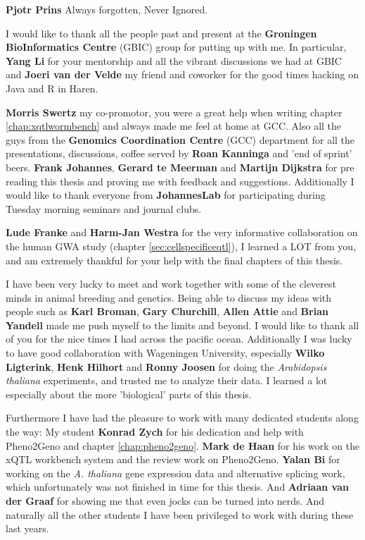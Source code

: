 {\bf Pjotr Prins} Always forgotten, Never Ignored. 

I would like to thank all the people past and present at the {\bf Groningen BioInformatics Centre} 
(GBIC) group for putting up with me. In particular, {\bf Yang Li} for your mentorship and all the 
vibrant discussions we had at GBIC and {\bf Joeri van der Velde} my friend and coworker for the 
good times hacking on Java and R in Haren.

{\bf Morris Swertz} my co-promotor, you were a great help when writing chapter \ref{chap:xqtlwormbench} 
and always made me feel at home at GCC. Also all the guys from the {\bf Genomics Coordination 
Centre} (GCC) department for all the presentations, discussions, coffee served by {\bf Roan Kanninga} and 'end of sprint' beers. 
{\bf Frank Johannes}, {\bf Gerard te Meerman} and {\bf Martijn Dijkstra} for pre reading this thesis and proving me 
with feedback and suggestions. Additionally I would like to thank everyone from {\bf JohannesLab} for participating during Tuesday morning 
seminars and journal clubs. 

{\bf Lude Franke} and {\bf Harm-Jan Westra} for the very informative collaboration on the 
human GWA study (chapter \ref{sec:cellspecificeqtl}), I learned a LOT from you, and am 
extremely thankful for your help with the final chapters of this thesis. 

I have been very lucky to meet and work together with some of the cleverest minds in animal breeding 
and genetics. Being able to discuss my ideas with people such as {\bf Karl Broman}, {\bf Gary Churchill}, 
{\bf Allen Attie} and {\bf Brian Yandell} made me push myself to the limits and beyond. I would like 
to thank all of you for the nice times I had across the pacific ocean. 
Additionally I was lucky to have good collaboration with Wageningen University, especially {\bf Wilko 
Ligterink}, {\bf Henk Hilhort} and {\bf Ronny Joosen} for doing the \emph{Arabidopsis thaliana} 
experiments, and trusted me to analyze their data. I learned a lot especially about the more 'biological' 
parts of this thesis. 

Furthermore I have had the pleasure to work with many dedicated students along the way: 
My student {\bf Konrad Zych} for his dedication and help with Pheno2Geno and chapter \ref{chap:pheno2geno}. 
{\bf Mark de Haan} for his work on the xQTL workbench system and the review work on Pheno2Geno.
{\bf Yalan Bi} for working on the \emph{A. thaliana} gene expression data and alternative splicing 
work, which unfortunately was not finished in time for this thesis. And {\bf Adriaan van der Graaf} for 
showing me that even jocks can be turned into nerds. And naturally all the other students I have been 
privileged to work with during these last years.

